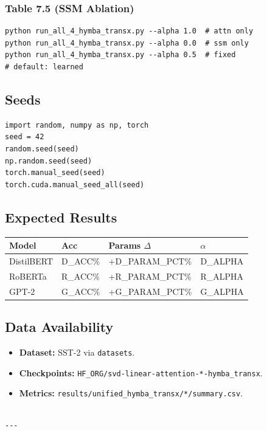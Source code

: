 \subsubsection{Table 7.5 (SSM Ablation)}
\begin{lstlisting}
python run_all_4_hymba_transx.py --alpha 1.0  # attn only
python run_all_4_hymba_transx.py --alpha 0.0  # ssm only
python run_all_4_hymba_transx.py --alpha 0.5  # fixed
# default: learned
\end{lstlisting}

\subsection{Seeds}

\begin{lstlisting}
import random, numpy as np, torch
seed = 42
random.seed(seed)
np.random.seed(seed)
torch.manual_seed(seed)
torch.cuda.manual_seed_all(seed)
\end{lstlisting}

\subsection{Expected Results}

\begin{table}[H]
\centering
\small
\begin{tabular}{llll}
\toprule
\textbf{Model} & \textbf{Acc} & \textbf{Params $\Delta$} & \textbf{$\alpha$} \\
\midrule
DistilBERT & {{D\_ACC}}\% & +{{D\_PARAM\_PCT}}\% & {{D\_ALPHA}} \\
RoBERTa & {{R\_ACC}}\% & +{{R\_PARAM\_PCT}}\% & {{R\_ALPHA}} \\
GPT-2 & {{G\_ACC}}\% & +{{G\_PARAM\_PCT}}\% & {{G\_ALPHA}} \\
\bottomrule
\end{tabular}
\end{table}

\subsection{Data Availability}

\begin{itemize}
\item \textbf{Dataset:} SST-2 via \texttt{datasets}.
\item \textbf{Checkpoints:} \texttt{{{HF\_ORG}}/svd-linear-attention-*-hymba\_transx}.
\item \textbf{Metrics:} \texttt{results/unified\_hymba\_transx/*/summary.csv}.
\end{itemize}
\begin{lstlisting}

---
\end{lstlisting}